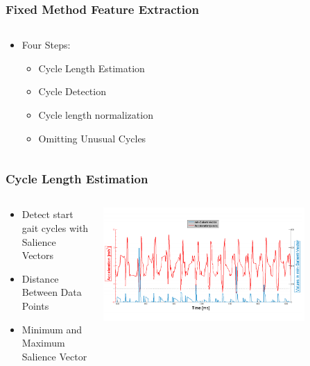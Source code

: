 \documentclass{beamer}
\begin{document}
\begin{frame}
  \frametitle{Fixed Method Feature Extraction}
  \begin{columns}
  \begin{column}{.5\textwidth}
  \begin{itemize}
  	\item Four Steps:
  	\begin{itemize}
  		\item Cycle Length Estimation
  		\linebreak
  		\item Cycle Detection
  		\linebreak
  		\item Cycle length normalization
  		\linebreak
  		\item Omitting Unusual Cycles
  	\end{itemize}
  \end{itemize}
  \end{column}
  \begin{column}{0.6\textwidth}
       \\
  \end{column}
  \end{columns}
\end{frame}

\begin{frame}
  \frametitle{Cycle Length Estimation}
  \begin{columns}
  \begin{column}{.5\textwidth}
  \begin{itemize}
  	\item Detect start gait cycles with Salience Vectors
  	\item Distance Between Data Points
  	\item Minimum and Maximum Salience Vector
  \end{itemize}
  \end{column}
    \begin{column}{0.7\textwidth}
   \includegraphics[width=0.8\textwidth]{Illustrations/svector.png}
       \\
  \end{column}
  \end{columns}
\end{frame}
\end{document}
